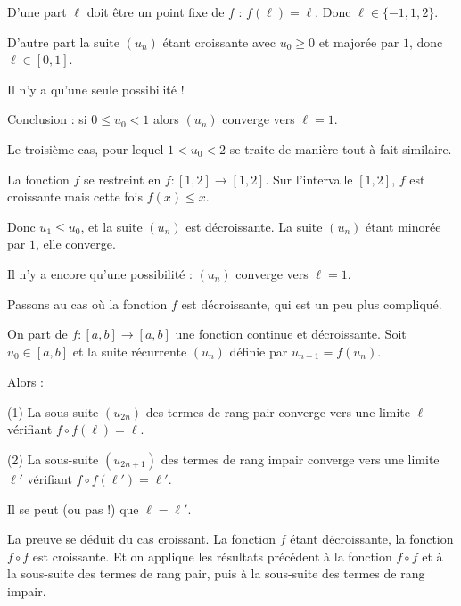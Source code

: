 \change

D'une part $\ell$ doit être un point fixe de $f$ : $f(\ell)=\ell$. Donc $\ell \in \{-1,1,2\}$.

\change

D'autre part la suite $(u_n)$ étant croissante avec $u_0\ge0$ et majorée par $1$, donc $\ell \in [0,1]$.

\change

Il n'y a qu'une seule possibilité !

Conclusion : si $0\le u_0<1$ alors $(u_n)$ converge vers $\ell = 1$. 


\change

\change

Le troisième cas, pour lequel $1 < u_0 < 2$ 
se traite de manière tout à fait similaire.

\change

  La fonction $f$ se restreint en $f : [1,2] \to [1,2]$. Sur l'intervalle $[1,2]$, $f$ est croissante
  mais cette fois $f(x) \le x$. 
  
\change

Donc $u_1 \le u_0$, et la suite $(u_n)$ est décroissante.
  La suite $(u_n)$ étant minorée par $1$, elle converge.

\change

Il n'y a encore qu'une possibilité : $(u_n)$ converge vers $\ell=1$.
  
  
\diapo

Passons au cas où la fonction $f$ est décroissante,
qui est un peu plus compliqué.

On part de $f : [a,b] \to [a,b]$ une fonction continue et décroissante.
Soit $u_0 \in [a,b]$ et la suite récurrente $(u_n)$ définie par $u_{n+1}=f(u_n)$.

Alors :

(1) La sous-suite $(u_{2n})$ des termes de rang pair converge vers une limite $\ell$  vérifiant $f\circ f(\ell)=\ell$.

(2) La sous-suite $(u_{2n+1})$ des termes de rang impair converge vers une limite $\ell'$ vérifiant $f\circ f(\ell')=\ell'$.


Il se peut (ou pas !) que $\ell=\ell'$.

La preuve se déduit du cas croissant.
La fonction $f$ étant décroissante, la fonction $f\circ f$ est croissante.
Et on applique les résultats précédent à la fonction $f\circ f$ et 
à la sous-suite des termes de rang pair, puis à la sous-suite des termes de rang impair.


